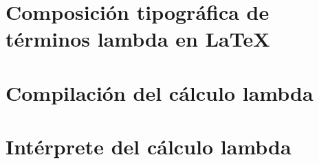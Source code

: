 \documentclass[12pt]{tesislcc}
\begin{document}
\conclusiones%



\appendix

\chapter{Composición tipográfica de términos lambda en \LaTeX}
%

\chapter{Compilación del cálculo lambda}
%

\chapter{Intérprete del cálculo lambda}
%

\listoffigures
\listoftables
\listofalgorithms%
\listoflistings%

\nocite{*}

\end{document}
